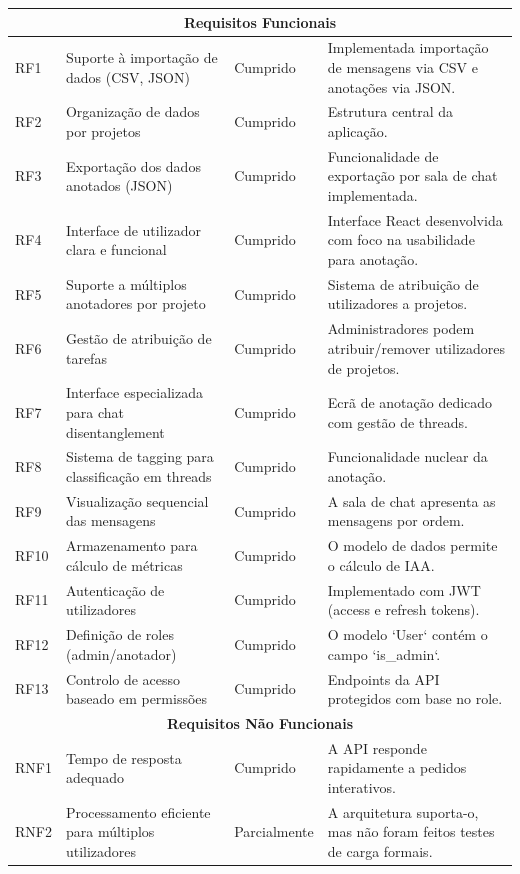 \begin{longtable}{|p{}|p{}|p{}|p{}|}
    \multicolumn{4}{|c|}{\textbf{Requisitos Funcionais}} \\
    \hline
    RF1 & Suporte à importação de dados (CSV, JSON) & Cumprido & Implementada importação de mensagens via CSV e anotações via JSON. \\
    \hline
    RF2 & Organização de dados por projetos & Cumprido & Estrutura central da aplicação. \\
    \hline
    RF3 & Exportação dos dados anotados (JSON) & Cumprido & Funcionalidade de exportação por sala de chat implementada. \\
    \hline
    RF4 & Interface de utilizador clara e funcional & Cumprido & Interface React desenvolvida com foco na usabilidade para anotação. \\
    \hline
    RF5 & Suporte a múltiplos anotadores por projeto & Cumprido & Sistema de atribuição de utilizadores a projetos. \\
    \hline
    RF6 & Gestão de atribuição de tarefas & Cumprido & Administradores podem atribuir/\-remover utilizadores de projetos. \\
    \hline
    RF7 & Interface especializada para chat disentanglement & Cumprido & Ecrã de anotação dedicado com gestão de threads. \\
    \hline
    RF8 & Sistema de tagging para classificação em threads & Cumprido & Funcionalidade nuclear da anotação. \\
    \hline
    RF9 & Visualização sequencial das mensagens & Cumprido & A sala de chat apresenta as mensagens por ordem. \\
    \hline
    RF10 & Armazenamento para cálculo de métricas & Cumprido & O modelo de dados permite o cálculo de IAA. \\
    \hline
    RF11 & Autenticação de utilizadores & Cumprido & Implementado com JWT (access e refresh tokens). \\
    \hline
    RF12 & Definição de roles (admin/\-anotador) & Cumprido & O modelo `User` contém o campo `is\_admin`. \\
    \hline
    RF13 & Controlo de acesso baseado em permissões & Cumprido & Endpoints da API protegidos com base no role. \\
    \hline
    \multicolumn{4}{|c|}{\textbf{Requisitos Não Funcionais}} \\
    \hline
    RNF1 & Tempo de resposta adequado & Cumprido & A API responde rapidamente a pedidos interativos. \\
    \hline
    RNF2 & Processamento eficiente para múltiplos utilizadores & Parcial\-mente & A arquitetura suporta-o, mas não foram feitos testes de carga formais. \\

\end{longtable}
